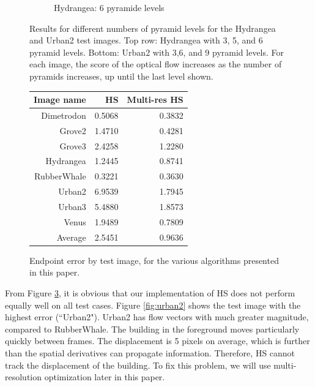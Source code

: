 \documentclass[10pt,twocolumn,letterpaper]{article}
\begin{document}
\begin{figure}
\begin{subfigure}[b]{0.3\textwidth}
		\caption{Hydrangea: 6 pyramide levels}
		\label{fig:hydrangea6}
	\end{subfigure}
	\caption{Results for different numbers of pyramid levels for the Hydrangea and Urban2 test images.  Top row: Hydrangea with 3, 5, and 6 pyramid levels.  Bottom: Urban2 with 3,6, and 9 pyramid levels. For each image, the score of the optical flow increases as the number of pyramids increases, up until the last level shown. }
	\label{fig:multires}
\end{figure}

\begin{figure}
\begin{tabular} {|r | r | r|}
\hline
Image name & HS & Multi-res HS \\
\hline 
Dimetrodon & 0.5068 &  0.3832 \\
Grove2 & 1.4710 & 0.4281 \\
Grove3 &  2.4258 & 1.2280 \\
Hydrangea & 1.2445 & 0.8741 \\
RubberWhale & 0.3221 & 0.3630 \\
Urban2 & 6.9539 & 1.7945 \\
Urban3 & 5.4880 & 1.8573 \\
Venus & 1.9489 & 0.7809 \\
\hline
Average & 2.5451 & 0.9636 \\
\hline

\end{tabular}

\caption{Endpoint error by test image, for the various algorithms presented in this paper.}
\label{fig:table}
\end{figure}

From Figure \ref{fig:table}, it is obvious that our implementation of HS does not perform equally well on all test cases.  Figure \ref{fig:urban2} shows the test image with the highest error (``Urban2").  Urban2 has flow vectors with much greater magnitude, compared to RubberWhale.  The building in the foreground moves particularly quickly between frames.  The displacement is 5 pixels on average, which is further than the spatial derivatives can propagate information.  Therefore, HS cannot track the displacement of the building.  To fix this problem, we will use multi-resolution optimization later in this paper.
\end{document}

